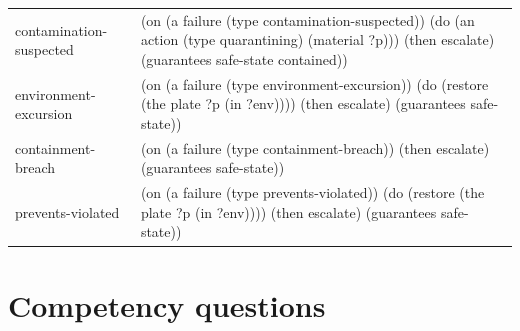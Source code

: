 \documentclass[10pt,a4paper]{article}
\begin{document}
{\begin{xltabular}{\linewidth}{lX}
contamination-suspected & (on (a failure (type contamination-suspected)) (do (an action (type quarantining) (material ?p))) (then escalate) (guarantees safe-state contained)) \\
environment-excursion & (on (a failure (type environment-excursion)) (do (restore (the plate ?p (in ?env)))) (then escalate) (guarantees safe-state)) \\
containment-breach & (on (a failure (type containment-breach)) (then escalate) (guarantees safe-state)) \\
prevents-violated & (on (a failure (type prevents-violated)) (do (restore (the plate ?p (in ?env)))) (then escalate) (guarantees safe-state)) \\
\end{xltabular}}

\section{Competency questions}\label{sec:appendix-cq}
\end{document}
